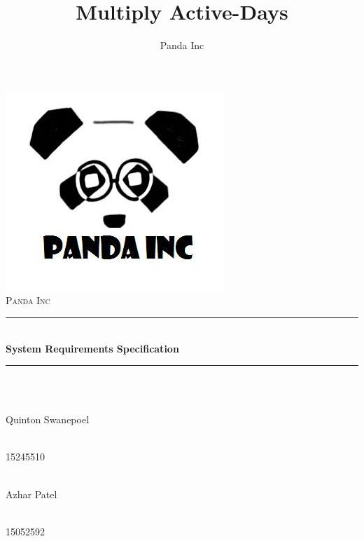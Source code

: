\documentclass[11pt]{article}
\author{Panda Inc}
\title{Multiply Active-Days}
\begin{document}
\begin{titlepage}
	
	\begin{center}
        \includegraphics[width=0.7\linewidth]{PandaInc_logo.jpg}\\[1cm] 
		\textsc{\LARGE Panda Inc}\\[0.3cm]
		\rule{\linewidth}{0.5mm} \\[1cm]
		{ \huge \bfseries  System Requirements Specification}\\[0.5cm]
		\rule{\linewidth}{0.5mm} \\[1cm] 		
  
		
		\begin{minipage}{0.4\textwidth}
			\begin{flushleft} \large
				\emph{} \\
				Quinton {Swanepoel}
			\end{flushleft}
		\end{minipage}
		\begin{minipage}{0.4\textwidth}
			\begin{flushright} \large
				\emph{} \\
				15245510
			\end{flushright}
		\end{minipage}

		\begin{minipage}{0.4\textwidth}
			\begin{flushleft} \large
            	\emph{} \\
				Azhar {Patel}
			\end{flushleft}
		\end{minipage}
		\begin{minipage}{0.4\textwidth}
			\begin{flushright} \large
				\emph{} \\
				15052592
			\end{flushright}
		\end{minipage}
		

\end{center}
\end{titlepage}
\end{document}
